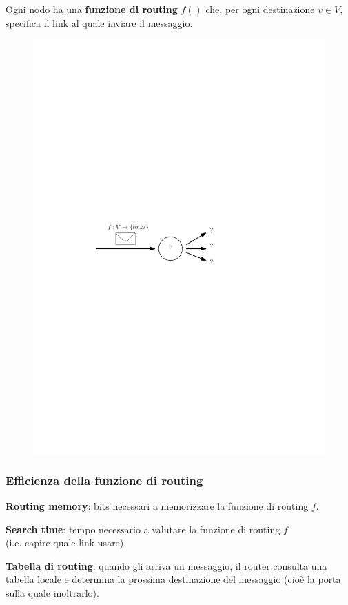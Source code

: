 \documentclass[10pt,xcolor=dvipsnames]{beamer}
\begin{document}
\begin{frame}{}
	Ogni nodo ha una \textbf{funzione di routing} $f()$ che, 
	per ogni destinazione $v\in V$, specifica il link al quale inviare il messaggio.
	\vfill
	\begin{figure}[h]
	\centering
	\includegraphics[scale=1]{example_routing.pdf}
	\end{figure}
\end{frame}

\begin{frame}
	\frametitle{Efficienza della funzione di routing}

	\textbf{Routing memory}: bits necessari a memorizzare la funzione di routing $f$.
	\vspace{8pt} 

	\textbf{Search time}: tempo necessario a valutare la funzione di routing $f$ \\(i.e. capire quale link usare).

	\vfill

	\textbf{Tabella di routing}: quando gli arriva un messaggio, il router consulta una tabella locale e determina
	la prossima destinazione del messaggio (cioè la porta sulla quale inoltrarlo).
\end{frame}
\end{document}
